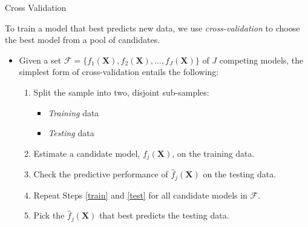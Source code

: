 \documentclass{beamer}\usepackage[]{graphicx}\usepackage[]{color}
\begin{document}
\begin{frame}{Cross Validation}

  To train a model that best predicts new data, we use \emph{cross-validation}
  to choose the best model from a pool of candidates.  
  \vb
  \begin{itemize}
  \item Given a set $\mathcal{F} = \{f_1(\mathbf{X}), f_2(\mathbf{X}), \ldots, 
    f_J(\mathbf{X})\}$ of $J$ competing models, the simplest form of 
    cross-validation entails the following:
    \vb
    \begin{enumerate}
    \item Split the sample into two, disjoint sub-samples:
      \begin{itemize}
      \item \emph{Training} data
      \item \emph{Testing} data
      \end{itemize}
      \vc
    \item Estimate a candidate model, $f_j(\mathbf{X})$, on the training data. 
      \label{train}
      \vb
    \item Check the predictive performance of $\hat{f}_j(\mathbf{X})$ on the 
      testing data. \label{test}
      \vb
    \item Repeat Steps \ref{train} and \ref{test} for all candidate models in 
      $\mathcal{F}$.
      \vb
    \item Pick the $\hat{f}_j(\mathbf{X})$ that best predicts the testing data.
    \end{enumerate}
  \end{itemize}
  
\end{frame}

\end{document}
